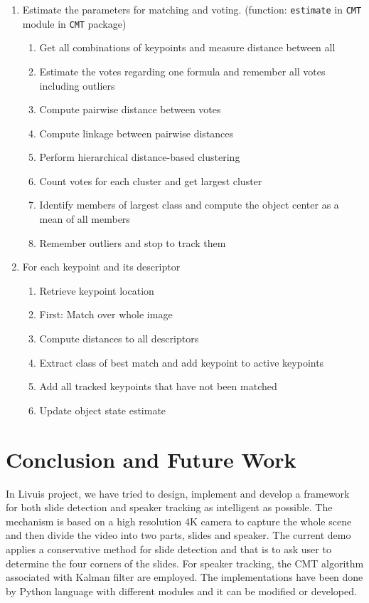 \documentclass[[12pt,DIV14,BCOR12mm,a4paper,footexclude,headinclude,halfparskip-,twoside,openright,cleardoubleempty,idxtotoc,bibtotoc]{article}
\begin{document}
\begin{itemize}
\begin{enumerate}
	\item Estimate the parameters for matching and voting. (function: \texttt{estimate} in \texttt{CMT} module in \texttt{CMT} package)

\begin{enumerate}
    	\item Get all combinations of keypoints and measure distance between all
   	 \item Estimate the votes regarding one formula and remember all votes including outliers
	\item Compute pairwise distance between votes
	\item Compute linkage between pairwise distances
	\item Perform hierarchical distance-based clustering
	\item Count votes for each cluster and get largest cluster
	\item Identify members of largest class and compute the object center as a mean of all members
	\item Remember outliers and stop to track them
  \end{enumerate}

    \item For each keypoint and its descriptor

\begin{enumerate}
    	\item Retrieve keypoint location
   	 \item First: Match over whole image
	\item Compute distances to all descriptors
	\item Extract class of best match and add keypoint to active keypoints
	\item Add all tracked keypoints that have not been matched
	\item Update object state estimate
 \end{enumerate}

  \end{enumerate}

\end{itemize}



\section{Conclusion and Future Work}

In Livuis project, we have tried to design, implement and develop a framework for both slide detection and speaker tracking as intelligent as possible. The mechanism is based on a high resolution 4K camera to capture the whole scene and then divide the video into two parts, slides and speaker. The current demo applies a conservative method for slide detection and that is to ask user to determine the four corners of the slides. For speaker tracking, the CMT algorithm associated with Kalman filter are employed. The implementations have been done by Python language with different modules and it can be modified or developed.
\end{document}
